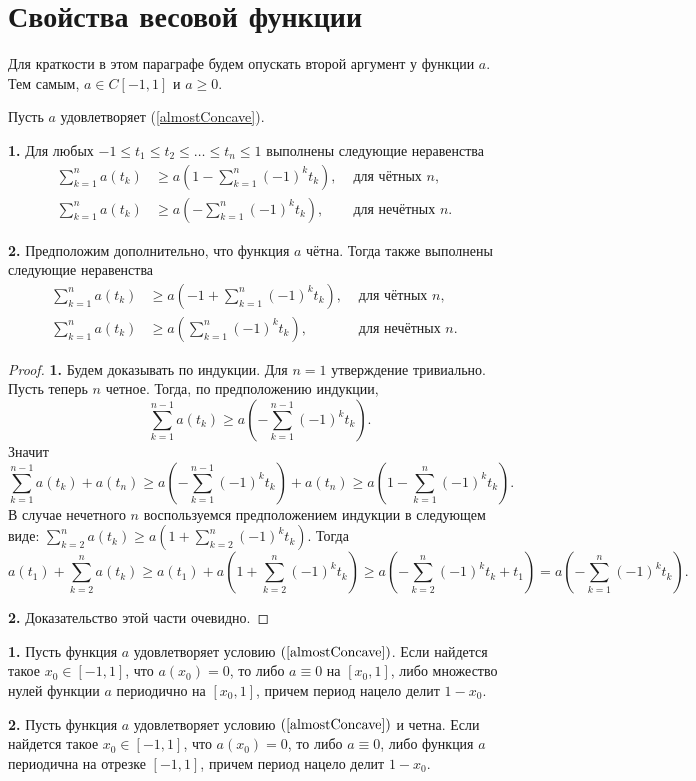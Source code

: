 \section{Свойства весовой функции}


Для краткости в этом параграфе будем опускать второй аргумент у функции $a$.
Тем самым, $a \in C[-1, 1]$ и $a \ge 0$.

\begin{lm}
\label{weightSum}
Пусть $a$ удовлетворяет (\ref{almostConcave}).

\textbf{1.}
Для любых $-1 \le t_1 \le t_2 \le \ldots \le t_n \le 1$ выполнены следующие неравенства
\begin{align*}
\sum_{k = 1}^n a(t_k) & \ge a( 1 - \sum_{k = 1}^n (-1)^k t_k), & \text{ для чётных $n$}, & \\
\sum_{k = 1}^n a(t_k) & \ge a(- \sum_{k = 1}^n (-1)^k t_k), & \text{ для нечётных $n$}. &
\end{align*}

\textbf{2.}
Предположим дополнительно, что функция $a$ чётна.
Тогда также выполнены следующие неравенства
\begin{align*}
\sum_{k = 1}^n a(t_k) & \ge a(-1 + \sum_{k = 1}^n (-1)^k t_k), & \text{ для чётных $n$}, & \\
\sum_{k = 1}^n a(t_k) & \ge a(\sum_{k = 1}^n (-1)^k t_k), & \text{ для нечётных $n$}. &
\end{align*}
\end{lm}

\begin{proof}
\textbf{1.}
Будем доказывать по индукции.
Для $n = 1$ утверждение тривиально.
Пусть теперь $n$ четное.
Тогда, по предположению индукции,
$$\sum_{k=1}^{n - 1} a(t_k) \ge a( -\sum_{k = 1}^{n - 1} (-1)^k t_k ).$$
Значит
$$\sum_{k = 1}^{n - 1} a( t_k ) + a( t_n ) \ge a( -\sum_{k = 1}^{n - 1} (-1)^k t_k ) + a( t_n ) \ge
a( 1 - \sum_{k = 1}^{n} (-1)^k t_k ).$$
В случае нечетного $n$ воспользуемся предположением индукции в следующем виде:
$\sum_{k=2}^n a(t_k) \ge a( 1 + \sum_{k = 2}^n (-1)^k t_k )$.
Тогда
$$
a( t_1 ) + \sum_{k = 2}^n a( t_k ) \ge a( t_1 ) + a( 1 + \sum_{k = 2}^{n} (-1)^k t_k ) \ge
a( -\sum_{k = 2}^{n} (-1)^k t_k + t_1 ) = a( -\sum_{k = 1}^{n} (-1)^k t_k ).
$$

\textbf{2.} Доказательство этой части очевидно.
\end{proof}

\begin{lm}
\label{periodicity}
\textbf{1.}
Пусть функция $a$ удовлетворяет условию $(\ref{almostConcave})$.
Если найдется такое $x_0 \in [-1, 1]$, что $a(x_0) = 0$,
то либо $a \equiv 0$ на $[x_0, 1]$,
либо множество нулей функции $a$ периодично на $[x_0, 1]$, причем период нацело делит $1 - x_0$.

\textbf{2.}
Пусть функция $a$ удовлетворяет условию $(\ref{almostConcave})$ и четна.
Если найдется такое $x_0 \in [-1, 1]$, что $a(x_0) = 0$,
то либо $a \equiv 0$,
либо функция $a$ периодична на отрезке $[-1, 1]$, причем период нацело делит $1 - x_0$.
\end{lm}

